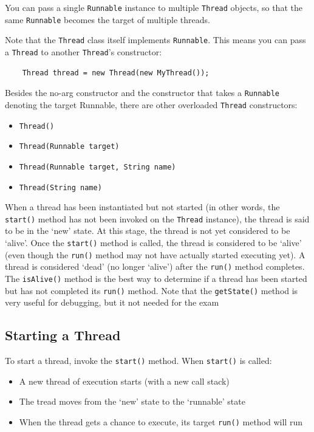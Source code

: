 You can pass a single \verb#Runnable# instance to multiple \verb#Thread# objects, so that the same \verb#Runnable# becomes the target of multiple threads.

Note that the \verb#Thread# class itself implements \verb#Runnable#. This means you can pass a \verb#Thread# to another \verb#Thread#'s constructor:
\begin{verbatim}
    Thread thread = new Thread(new MyThread());
\end{verbatim}

Besides the no-arg constructor and the constructor that takes a \verb#Runnable# denoting the target Runnable, there are other overloaded \verb#Thread# constructors:
\begin{itemize}
    \item \verb#Thread()#
    \item \verb#Thread(Runnable target)#
    \item \verb#Thread(Runnable target, String name)#
    \item \verb#Thread(String name)#
\end{itemize}
When a thread has been instantiated but not started (in other words, the \verb#start()# method has not been invoked on the \verb#Thread# instance), the thread is said to be in the `new' state. At this stage, the thread is not yet considered to be `alive'. Once the \verb#start()# method is called, the thread is considered to be `alive' (even though the \verb#run()# method may not have actually started executing yet). A thread is considered `dead' (no longer `alive') after the \verb#run()# method completes. The \verb#isAlive()# method is the best way to determine if a thread has been started but has not completed its \verb#run()# method. Note that the \verb#getState()# method is very useful for debugging, but it not needed for the exam

\subsection{Starting a Thread}
To start a thread, invoke the \verb#start()# method. When \verb#start()# is called:
\begin{itemize}
    \item A new thread of execution starts (with a new call stack)
    \item The tread moves from the `new' state to the `runnable' state
    \item When the thread gets a chance to execute, its target \verb#run()# method will run
\end{itemize}

